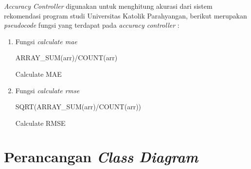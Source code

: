 \textit{Accuracy Controller} digunakan untuk menghitung akurasi dari sistem rekomendasi program studi Universitas Katolik Parahyangan, berikut merupakan \textit{pseudocode} fungsi yang terdapat pada \textit{accuracy controller} :

\begin{enumerate}
    \item Fungsi \textit{calculate mae}\\
    
        \begin{algorithm}[H]
            \begin{algorithmic}[1]
                   \State \Return ARRAY\_SUM(arr)/COUNT(arr)
                \EndProcedure
            \end{algorithmic} 
            \caption{Calculate MAE}
            \label{alg:calculateMAE}
        \end{algorithm}
    
    \item Fungsi \textit{calculate rmse}\\
    
        \begin{algorithm}[H]
            \begin{algorithmic}[1]
                   \State \Return SQRT(ARRAY\_SUM(arr)/COUNT(arr))
                \EndProcedure
            \end{algorithmic} 
            \caption{Calculate RMSE}
            \label{alg:calculateRMSE}
        \end{algorithm}
\end{enumerate}

\section{Perancangan \textit{Class Diagram}}
\label{sec:perancangan class diagram}

